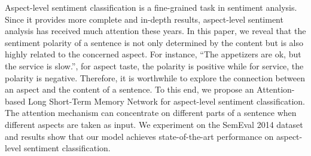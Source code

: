 Aspect-level sentiment classification is a fine-grained task in sentiment analysis. Since it provides more complete and in-depth results, aspect-level sentiment analysis has received much attention these years. In this paper, we reveal that the sentiment polarity of a sentence is not only determined by the content but is also highly related to the concerned aspect. For instance, ``The appetizers are ok, but the service is slow.'', for aspect taste, the polarity is positive while for service, the polarity is negative. Therefore, it is worthwhile to explore the connection between an aspect and the content of a sentence. To this end, we propose an Attention-based Long Short-Term Memory Network for aspect-level sentiment classification. The attention mechanism can concentrate on different parts of a sentence when different aspects are taken as input. We experiment on the SemEval 2014 dataset and results show that our model achieves state-of-the-art performance on aspect-level sentiment classification.
